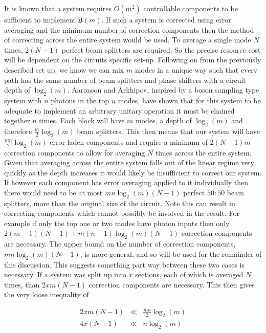 \documentclass[aps,pra,twocolumn,superscriptaddress,numerical]{revtex4-1}
\begin{document}
		It is known \cite{reck} that a system requires $O\left(m^{2}\right)$ controllable components to be sufficient to implement $\mathfrak{U}\left(m\right)$. If such a system is corrected using error averaging and the minimum number of correction components then the method of correcting across the entire system would be used. To average a single mode $N$ times, $2\left(N-1\right)$ perfect beam splitters are required. So the precise resource cost will be dependent on the circuits specific set-up. Following on from the previously described set up, we know we can mix $m$ modes in a unique way such that every path has the same number of beam splitters and phase shifters with a circuit depth of $\log_{2}\left(m\right)$. Aaronson and Arkhipov, inspired by a boson sampling type system with $n$ photons in the top $n$ modes, have shown \cite{Boson} that for this system to be adequate to implement an arbitrary unitary operation it must be chained together $n$ times. Each block will have $m$ modes, a depth of $\log_{2}\left(m\right)$ and therefore $\frac{m}{2}\log_{2}\left(m\right)$ beam splitters.	This then means that our system will have $\frac{mn}{2}\log_{2}\left(m\right)$ error laden components and require a minimum of $2\left(N-1\right)m$ correction components to allow for averaging $N$ times across the entire system. Given that averaging across the entire system falls out of the linear regime very quickly as the depth increases it would likely	be insufficient to correct our system. If however each component has error averaging applied to it individually then there would need to be at most $mn\log_{2}\left(m\right)\left(N-1\right)$ perfect $50:50$ beam splitters, more than the original size of the circuit. Note this can result in correcting components which cannot possibly be involved	in the result. For example if only the top one or two modes have photon inputs then only $2\left(m-1\right)\left(N-1\right)+m\left(n-1\right)\log_{2}\left(m\right)\left(N-1\right)$	correction components are necessary. The upper bound on the number of correction components, $mn\log_{2}\left(m\right)\left(N-1\right)$, is more general, and so will be used for the remainder of this discussion. This suggests something part way between these two cases is necessary. If a system was split	up into $x$ sections, each of which is averaged $N$ times, than $2xm\left(N-1\right)$ correction components are necessary. This then gives the very loose inequality of 
		
		\begin{eqnarray}
			2xm\left(N-1\right) & \ll & \frac{mn}{2}\log_{2}\left(m\right)\nonumber \\
			4x\left(N-1\right) & \ll & n\log_{2}\left(m\right)\label{eq:veryLooseInequality}
		\end{eqnarray}
		
\end{document}
